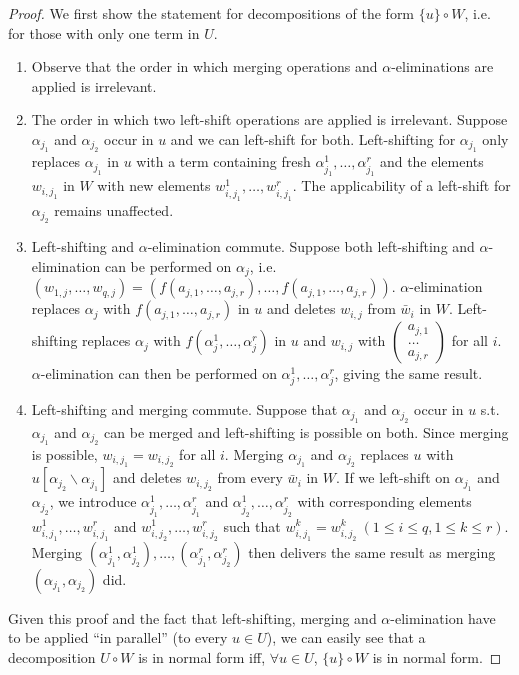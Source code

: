 \documentclass[a4paper, 11pt]{report}
\newcommand{\colvec}[1]{\left(\begin{array}{c}#1\end{array}\right)}
\begin{document}
\begin{proof}
  We first show the statement for decompositions of the form $\{u\} \circ W$, i.e. for those with only one term in $U$.
  \begin{enumerate}
    \item Observe that the order in which merging operations and $\alpha$-eliminations are applied is irrelevant. 
    \item The order in which two left-shift operations are applied is irrelevant. Suppose $\alpha_{j_1}$ and $\alpha_{j_2}$ occur in $u$ and
          we can left-shift for both. Left-shifting for $\alpha_{j_1}$ only replaces $\alpha_{j_1}$ in $u$ with a term containing fresh
          $\alpha_{j_1}^1,\dots,\alpha_{j_1}^r$ and the elements $w_{i,j_1}$ in $W$ with new elements $w_{i,j_1}^1,\dots,w_{i,j_1}^r$.
          The applicability of a left-shift for $\alpha_{j_2}$ remains unaffected.
    \item Left-shifting and $\alpha$-elimination commute.
          Suppose both left-shifting and $\alpha$-elimination can be performed on $\alpha_j$, i.e.\\
          $(w_{1,j},\dots,w_{q,j}) = (f(a_{j,1},\dots,a_{j,r}),\dots,f(a_{j,1},\dots,a_{j,r}))$.
          $\alpha$-elimination replaces $\alpha_j$ with $f(a_{j,1},\dots,a_{j,r})$ in $u$ and deletes $w_{i,j}$ from $\bar{w}_i$ in $W$.
          Left-shifting replaces $\alpha_j$ with $f(\alpha_j^1,\dots,\alpha_j^r)$ in $u$ and $w_{i,j}$ with $\colvec{a_{j,1}\\\dots\\a_{j,r}}$
          for all $i$. $\alpha$-elimination can then be performed on $\alpha_j^1,\dots,\alpha_j^r$, giving the same result.
    \item Left-shifting and merging commute. Suppose that $\alpha_{j_1}$ and $\alpha_{j_2}$ occur in $u$ s.t. $\alpha_{j_1}$ and $\alpha_{j_2}$
          can be merged and left-shifting is possible on both.
          Since merging is possible, $w_{i,j_1} =w_{i,j_2}$ for all $i$. Merging $\alpha_{j_1}$ and $\alpha_{j_2}$ replaces $u$
          with $u[\alpha_{j_2}\backslash \alpha_{j_1}]$ and deletes $w_{i,j_2}$ from every $\bar{w}_i$ in $W$.
          If we left-shift on $\alpha_{j_1}$ and $\alpha_{j_2}$, we introduce $\alpha_{j_1}^1,\dots,\alpha_{j_1}^r$ and $\alpha_{j_2}^1,\dots,\alpha_{j_2}^r$
          with corresponding elements $w_{i,j_1}^1,\dots,w_{i,j_1}^r$ and $w_{i,j_2}^1,\dots,w_{i,j_2}^r$
          such that $w_{i,j_1}^k = w_{i,j_2}^k\ (1 \leq i \leq q, 1 \leq k \leq r)$.
          Merging $(\alpha_{j_1}^1, \alpha_{j_2}^1), \dots, (\alpha_{j_1}^r, \alpha_{j_2}^r)$ then delivers the same result as merging $(\alpha_{j_1},\alpha_{j_2})$ did. 
  \end{enumerate}

  Given this proof and the fact that left-shifting, merging and $\alpha$-elimination have to be applied ``in parallel'' (to every $u \in U$), we can easily see that a decomposition $U \circ W$ is in normal form iff, $\forall u \in U$, $\{u\} \circ W$ is in normal form.
\end{proof}
\end{document}
